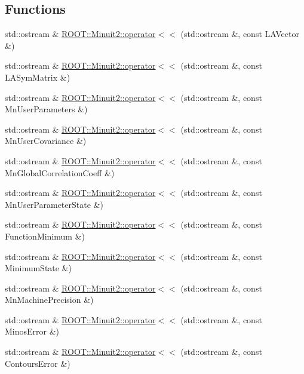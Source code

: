 \subsection*{Functions}
\begin{DoxyCompactItemize}
\item 
std\+::ostream \& \mbox{\hyperlink{namespaceROOT_1_1Minuit2_a687e586a693320c3d638977d002a9e50}{R\+O\+O\+T\+::\+Minuit2\+::operator$<$$<$}} (std\+::ostream \&, const L\+A\+Vector \&)
\item 
std\+::ostream \& \mbox{\hyperlink{namespaceROOT_1_1Minuit2_a37c2d73b40109f988c5ea59e1edf1f8d}{R\+O\+O\+T\+::\+Minuit2\+::operator$<$$<$}} (std\+::ostream \&, const L\+A\+Sym\+Matrix \&)
\item 
std\+::ostream \& \mbox{\hyperlink{namespaceROOT_1_1Minuit2_a950e1e56f48df042ba519464bda3f1ea}{R\+O\+O\+T\+::\+Minuit2\+::operator$<$$<$}} (std\+::ostream \&, const Mn\+User\+Parameters \&)
\item 
std\+::ostream \& \mbox{\hyperlink{namespaceROOT_1_1Minuit2_ab0d367617b39c46b8b0eeef75ecc5b75}{R\+O\+O\+T\+::\+Minuit2\+::operator$<$$<$}} (std\+::ostream \&, const Mn\+User\+Covariance \&)
\item 
std\+::ostream \& \mbox{\hyperlink{namespaceROOT_1_1Minuit2_ad8fa7aff1b1b2645f8b2a9c9a2231252}{R\+O\+O\+T\+::\+Minuit2\+::operator$<$$<$}} (std\+::ostream \&, const Mn\+Global\+Correlation\+Coeff \&)
\item 
std\+::ostream \& \mbox{\hyperlink{namespaceROOT_1_1Minuit2_a30dd5b9978bba19603bb3fb0f7427ddc}{R\+O\+O\+T\+::\+Minuit2\+::operator$<$$<$}} (std\+::ostream \&, const Mn\+User\+Parameter\+State \&)
\item 
std\+::ostream \& \mbox{\hyperlink{namespaceROOT_1_1Minuit2_a38083dea2c583232d8c33ed056b555ef}{R\+O\+O\+T\+::\+Minuit2\+::operator$<$$<$}} (std\+::ostream \&, const Function\+Minimum \&)
\item 
std\+::ostream \& \mbox{\hyperlink{namespaceROOT_1_1Minuit2_a172c627b1d5fd6191ca54f94090cd304}{R\+O\+O\+T\+::\+Minuit2\+::operator$<$$<$}} (std\+::ostream \&, const Minimum\+State \&)
\item 
std\+::ostream \& \mbox{\hyperlink{namespaceROOT_1_1Minuit2_a490766f2dd62363c6729e716a8da5da8}{R\+O\+O\+T\+::\+Minuit2\+::operator$<$$<$}} (std\+::ostream \&, const Mn\+Machine\+Precision \&)
\item 
std\+::ostream \& \mbox{\hyperlink{namespaceROOT_1_1Minuit2_a21121467830697f28cd9d979108c44dd}{R\+O\+O\+T\+::\+Minuit2\+::operator$<$$<$}} (std\+::ostream \&, const Minos\+Error \&)
\item 
std\+::ostream \& \mbox{\hyperlink{namespaceROOT_1_1Minuit2_a5f32b6f73f8b284fbc74fbf211a7b4ac}{R\+O\+O\+T\+::\+Minuit2\+::operator$<$$<$}} (std\+::ostream \&, const Contours\+Error \&)
\end{DoxyCompactItemize}


